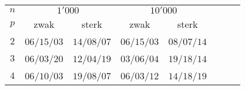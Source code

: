 \begin{tabular}{cccccccc}
\toprule
$n$&\multicolumn{2}{c}{$1'000$}&\multicolumn{2}{c}{$10'000$}\\
$p$&zwak&sterk&zwak&sterk\\\midrule
$2$&$06$/$15$/$03$&$14$/$08$/$07$&$06$/$15$/$03$&$08$/$07$/$14$\\
$3$&$06$/$03$/$20$&$12$/$04$/$19$&$03$/$06$/$04$&$19$/$18$/$14$\\
$4$&$06$/$10$/$03$&$19$/$08$/$07$&$06$/$03$/$12$&$14$/$18$/$19$\\
\bottomrule
\end{tabular}